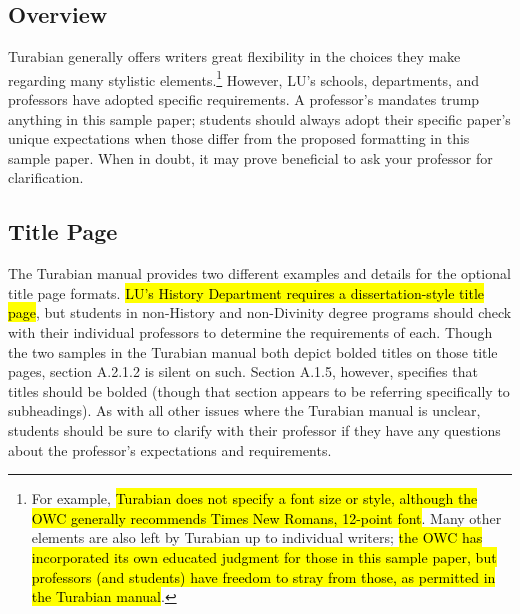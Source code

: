 \documentclass[raggedright]{turabian-researchpaper}
\begin{document}
\subsection{Overview}

Turabian generally offers writers great flexibility in the choices they make
regarding many stylistic elements.\footnote{For example, \hl{Turabian does not
specify a font size or style, although the OWC generally recommends Times New
Romans, 12-point font}. Many other elements are also left by Turabian up to
individual writers; \hl{the OWC has incorporated its own educated judgment for
those in this sample paper, but professors (and students) have freedom to stray
from those, as permitted in the Turabian manual}.} However, LU's schools,
departments, and professors have adopted specific requirements. A professor's
mandates trump anything in this sample paper; students should always adopt their
specific paper's unique expectations when those differ from the proposed
formatting in this sample paper. When in doubt, it may prove beneficial to ask
your professor for clarification.

\subsection{Title Page}

The Turabian manual provides two different examples and details for the optional
title page formats.\autocite[377-76]{Turabian} \hl{LU's History Department
requires a dissertation-style title page}, but students in non-History and
non-Divinity degree programs should check with their individual professors to
determine the requirements of each. Though the two samples in the Turabian
manual\autocite[376]{Turabian} both depict bolded titles on those title pages,
section A.2.1.2\autocite[376]{Turabian} is silent on such. Section A.1.5,
however, specifies that titles should be bolded (though that section appears to
be referring specifically to subheadings).\autocite[374-75]{Turabian} As with
all other issues where the Turabian manual is unclear, students should be sure
to clarify with their professor if they have any questions about the professor's
expectations and requirements.
\end{document}
